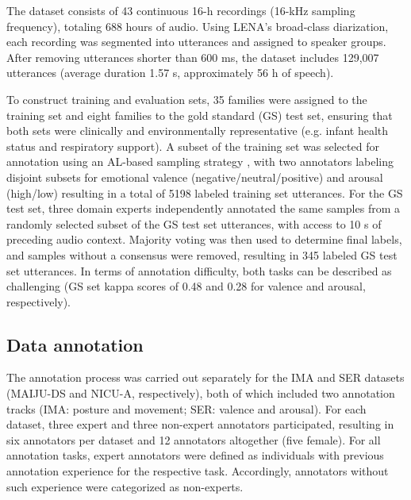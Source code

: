 \documentclass[a4paper,fleqn]{cas-dc}
\begin{document}
The dataset consists of 43 continuous 16-h recordings (16-kHz sampling frequency), totaling 688 hours of audio. Using LENA’s broad‑class diarization, each recording was segmented into utterances and assigned to speaker groups. After removing utterances shorter than 600 ms, the dataset includes 129,007 utterances (average duration 1.57 s, approximately 56 h of speech).

To construct training and evaluation sets, 35 families were assigned to the training set and eight families to the gold standard (GS) test set, ensuring that both sets were clinically and environmentally representative (e.g. infant health status and respiratory support). A subset of the training set was selected for annotation using an AL-based sampling strategy \cite{nicu_a_speechcomm}, with two annotators labeling disjoint subsets for emotional valence (negative/neutral/positive) and arousal (high/low) resulting in a total of 5198 labeled training set utterances. For the GS test set, three domain experts independently annotated the same samples from a randomly selected subset of the GS test set utterances, with access to 10 s of preceding audio context. Majority voting was then used to determine final labels, and samples without a consensus were removed, resulting in 345 labeled GS test set utterances. In terms of annotation difficulty, both tasks can be described as challenging (GS set kappa scores of 0.48 and 0.28 for valence and arousal, respectively).


\subsection{Data annotation} \label{subsec_data_annotation}

The annotation process was carried out separately for the IMA and SER datasets (MAIJU-DS and NICU-A, respectively), both of which included two annotation tracks (IMA: posture and movement; SER: valence and arousal). For each dataset, three expert and three non-expert annotators participated, resulting in six annotators per dataset and 12 annotators altogether (five female). For all annotation tasks, expert annotators were defined as individuals with previous annotation experience for the respective task. Accordingly, annotators without such experience were categorized as non-experts.
\end{document}
